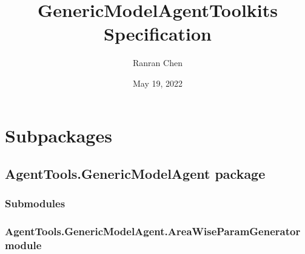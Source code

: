 \documentclass[letterpaper,10pt,english]{sphinxmanual}
\title{GenericModelAgentToolkits Specification}
\date{May 19, 2022}
\author{Ranran Chen}
\begin{document}
\pagestyle{empty}
\sphinxmaketitle
\pagestyle{plain}
\sphinxtableofcontents
\pagestyle{normal}
\label{\detokenize{AgentTools::doc}}



\chapter{Subpackages}
\label{\detokenize{AgentTools:subpackages}}

\section{AgentTools.GenericModelAgent package}
\label{\detokenize{AgentTools.GenericModelAgent:agenttools-genericmodelagent-package}}\label{\detokenize{AgentTools.GenericModelAgent::doc}}

\subsection{Submodules}
\label{\detokenize{AgentTools.GenericModelAgent:submodules}}

\subsection{AgentTools.GenericModelAgent.AreaWiseParamGenerator module}
\label{\detokenize{AgentTools.GenericModelAgent:module-AgentTools.GenericModelAgent.AreaWiseParamGenerator}}\label{\detokenize{AgentTools.GenericModelAgent:agenttools-genericmodelagent-areawiseparamgenerator-module}}
\end{document}
